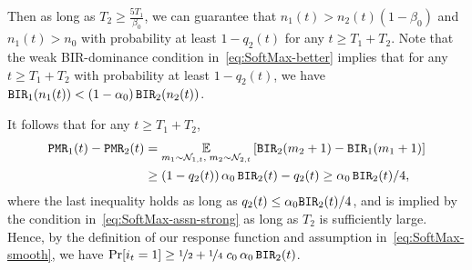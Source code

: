 Then as long as
$T_2 \geq \frac{5T_1}{\beta_0}$, we can guarantee that
$n_1(t) > n_2(t) (1 - \beta_0)$ and $n_1(t) > n_0$ with probability at
least $1 - q_2(t)$ for any $t \geq T_1 + T_2$.
Note that the weak BIR-dominance condition
in~\eqref{eq:SoftMax-better} implies that for any $t\geq T_1 + T_2$
with probability at least $1 - q_2(t)$, we have
$ \mathtt{BIR}_1(n_1(t)) < (1- \alpha_0)\,\mathtt{BIR}_2(n_2(t))$.

It follows that for any $t\geq T_1 + T_2$,
\begin{align*}
  \mathtt{PMR}_1(t) - \mathtt{PMR}_2(t) &= \operatorname*{\mathbb{E}}_{m_1\sim \mathcal{N}_{1,t},\;m_2\sim \mathcal{N}_{2,t}}\left[\mathtt{BIR}_2(m_2+ 1) - \mathtt{BIR}_1(m_1+1)\right] \\
                        &\geq (1 - q_2(t))\,\alpha_0\, \mathtt{BIR}_2(t) - q_2(t)
                        \geq \alpha_0\, \mathtt{BIR}_2(t)/4,
\end{align*}
where the last inequality holds as long as
$q_2(t) \leq \alpha_0\mathtt{BIR}_2(t)/4$, and is implied by the condition
in~\eqref{eq:SoftMax-assn-strong} as long as $T_2$ is sufficiently
large. Hence, by the definition of our \SoftMaxRandom response
function and assumption in~\eqref{eq:SoftMax-smooth}, we have
$  \Pr[i_t = 1] \geq \nicefrac{1}{2} +
    \nicefrac{1}{4}\; c_0\,\alpha_0\,\mathtt{BIR}_2(t)$.

